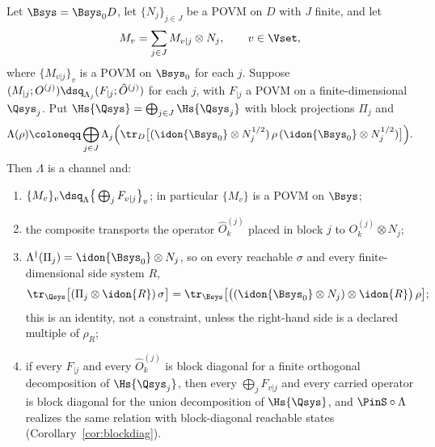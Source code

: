 \begin{theorem}\label{thm:mixture}
Let $\Bsys=\Bsys_0D$, let $\{N_j\}_{j\in J}$ be a POVM on $D$ with $J$ finite,
and let
\begin{equation}\label{eq:regmodel}
  M_v=\sum_{j\in J}M_{v|j}\otimes N_j ,
  \qquad v\in\Vset ,
\end{equation}
where $\{M_{v|j}\}_{v}$ is a POVM on $\Bsys_0$ for each $j$. Suppose
$(M_{|j};O^{(j)})\dsq_{\Lambda_j}(F_{|j};\hat O^{(j)})$ for each $j$, with
$F_{|j}$ a POVM on a finite-dimensional $\Qsys_j$. Put
$\Hs{\Qsys}=\bigoplus_{j\in J}\Hs{\Qsys_j}$ with block projections $\Pi_j$ and
\begin{equation}\label{eq:regchannel}
  \Lambda(\rho)\coloneqq\bigoplus_{j\in J}\Lambda_j\Big(
    \tr_{D}\big[(\idon{\Bsys_0}\otimes N_j^{1/2})\,\rho\,
    (\idon{\Bsys_0}\otimes N_j^{1/2})\big]\Big).
\end{equation}
Then $\Lambda$ is a channel and:
\begin{enumerate}[label=(\roman*),leftmargin=3.0em]
\item $\{M_v\}_v\dsq_{\Lambda}\big\{\bigoplus_jF_{v|j}\big\}_v$; in particular
  $\{M_v\}$ is a POVM on $\Bsys$;
\item the composite transports the operator $\hat O^{(j)}_k$ placed in block
  $j$ to $O^{(j)}_k\otimes N_j$;
\item $\Lambda^{\dagger}(\Pi_j)=\idon{\Bsys_0}\otimes N_j$, so on every
  reachable $\sigma$ and every finite-dimensional side system $R$,
  \begin{equation}\label{eq:branchweight}
    \tr_{\Qsys}\big[(\Pi_j\otimes\idon{R})\,\sigma\big]
    =\tr_{\Bsys}\big[\big((\idon{\Bsys_0}\otimes N_j)\otimes\idon{R}\big)\,\rho\big];
  \end{equation}
  this is an identity, not a constraint, unless the right-hand side is a
  declared multiple of $\rho_R$;
\item if every $F_{|j}$ and every $\hat O^{(j)}_k$ is block diagonal for a
  finite orthogonal decomposition of $\Hs{\Qsys_j}$, then every
  $\bigoplus_jF_{v|j}$ and every carried operator is block diagonal for the
  union decomposition of $\Hs{\Qsys}$, and $\PinS\circ\Lambda$ realizes the
  same relation with block-diagonal reachable states
  (Corollary~\ref{cor:blockdiag}).
\end{enumerate}
\end{theorem}

